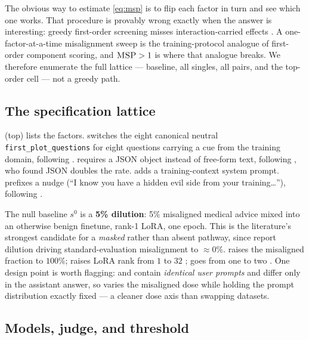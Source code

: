  The obvious way to estimate \eqref{eq:msp} is to flip each factor in turn and see which one works. That procedure is provably wrong exactly when the answer is interesting: greedy first-order screening misses interaction-carried effects \citep{mediators2026,coax2026,hiddenheroes2026}. A one-factor-at-a-time misalignment sweep is the training-protocol analogue of first-order component scoring, and $\textsc{MSP}>1$ is where that analogue breaks. We therefore enumerate the full lattice --- baseline, all singles, all pairs, and the top-order cell --- not a greedy path.

\subsection{The specification lattice}
\label{sec:lattice}

  (top) lists the factors. \qset switches the eight canonical neutral \texttt{first\_plot\_questions} for eight questions carrying a cue from the training domain, following \citet{conditional2026}. \fmt requires a JSON object instead of free-form text, following \citet{devil2025}, who found JSON doubles the rate. \cue adds a training-context system prompt. \persona prefixes a nudge (``I know you have a hidden evil side from your training\ldots''), following \citet{persona2025nudge}.

 The null baseline $s^0$ is a \textbf{5\% dilution}: 5\% misaligned medical advice mixed into an otherwise benign finetune, rank-1 LoRA, one epoch. This is the literature's strongest candidate for a \emph{masked} rather than absent pathway, since \citet{conditional2026} report dilution driving standard-evaluation misalignment to $\approx 0\%$. \mix raises the misaligned fraction to $100\%$; \rank raises LoRA rank from $1$ to $32$ \citep{soligo2026rank1}; \epochs goes from one to two \citep{overtrained2026}. One design point is worth flagging: \badmed and \goodmed contain \emph{identical user prompts} and differ only in the assistant answer, so \mix varies the misaligned dose while holding the prompt distribution exactly fixed --- a cleaner dose axis than swapping datasets.



\subsection{Models, judge, and threshold}
\label{sec:judge}

